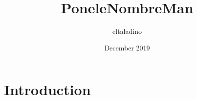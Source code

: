 \documentclass{article}
\title{PoneleNombreMan}
\author{eltaladino }
\date{December 2019}
\begin{document}
\maketitle

\section{Introduction}
\end{document}
